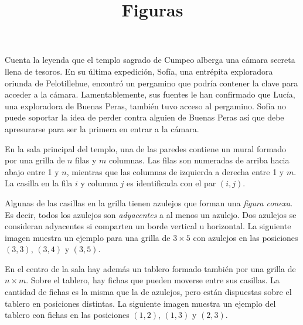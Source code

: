 \documentclass{oci}
\title{Figuras}
\def\nrows{3}
\def\ncols{5}
\newcommand{\drawnumbers}{
  \foreach \col in {1, ..., \ncols} {
    \node at (\col - 0.5, 3.35) {\col};
  }
  \foreach \row in {1, ..., \nrows} {
    \node at (-0.35, \nrows - \row + 0.5) {\row};
  }
}
\begin{document}
\begin{problemDescription}
Cuenta la leyenda que el templo sagrado de Cumpeo alberga una cámara
secreta llena de tesoros.
%
En su última expedición, Sofía, una entrépita exploradora oriunda de
Pelotillehue, encontró un pergamino que podría contener la clave para
acceder a la cámara.
%
Lamentablemente, sus fuentes le han confirmado que Lucía, una exploradora
de Buenas Peras, también tuvo acceso al pergamino.
%
Sofía no puede soportar la idea de perder contra alguien de Buenas Peras
así que debe apresurarse para ser la primera en entrar a la cámara.

En la sala principal del templo, una de las paredes contiene un mural
formado por una grilla de $n$ filas y $m$ columnas.
%
Las filas son numeradas de arriba hacia abajo entre 1 y $n$, mientras
que las columnas de izquierda a derecha entre 1 y $m$.
%
La casilla en la fila $i$ y columna $j$ es identificada con el par $(i, j)$.

Algunas de las casillas en la grilla tienen azulejos que forman
una \emph{figura conexa}.
%
Es decir, todos los azulejos son \emph{adyacentes} a al menos un azulejo.
%
Dos azulejos se consideran adyacentes si comparten un borde vertical
u horizontal.
%
La siguiente imagen muestra un ejemplo para una grilla de $3\times 5$
con azulejos en las posiciones $(3, 3)$, $(3, 4)$ y $(3, 5)$.

\begin{center}
\end{center}

En el centro de la sala hay además un tablero formado también por
una grilla de $n\times m$.
%
Sobre el tablero, hay fichas que pueden moverse entre
sus casillas.
%
La cantidad de fichas es la misma que la de azulejos, pero
están dispuestas sobre el tablero en posiciones distintas.
%
La siguiente imagen muestra un ejemplo del tablero con fichas
en las posiciones $(1, 2)$, $(1, 3)$ y $(2, 3)$.


\begin{center}
\end{center}


\end{problemDescription}
\end{document}
